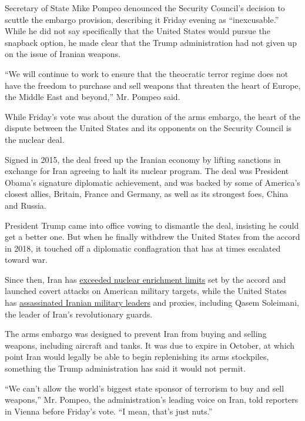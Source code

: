 Secretary of State Mike Pompeo denounced the Security Council's decision
to scuttle the embargo provision, describing it Friday evening as
``inexcusable.'' While he did not say specifically that the United
States would pursue the snapback option, he made clear that the Trump
administration had not given up on the issue of Iranian weapons.

``We will continue to work to ensure that the theocratic terror regime
does not have the freedom to purchase and sell weapons that threaten the
heart of Europe, the Middle East and beyond,'' Mr. Pompeo said.

While Friday's vote was about the duration of the arms embargo, the
heart of the dispute between the United States and its opponents on the
Security Council is the nuclear deal.

Signed in 2015, the deal freed up the Iranian economy by lifting
sanctions in exchange for Iran agreeing to halt its nuclear program. The
deal was President Obama's signature diplomatic achievement, and was
backed by some of America's closest allies, Britain, France and Germany,
as well as its strongest foes, China and Russia.

President Trump came into office vowing to dismantle the deal, insisting
he could get a better one. But when he finally withdrew the United
States from the accord in 2018, it touched off a diplomatic
conflagration that has at times escalated toward war.

Since then, Iran has
\href{https://www.nytimes3xbfgragh.onion/2019/07/01/world/middleeast/iran-uranium-enrichment-limit.html}{exceeded
nuclear enrichment limits} set by the accord and launched covert attacks
on American military targets, while the United States has
\href{https://www.nytimes3xbfgragh.onion/2020/01/02/world/middleeast/qassem-soleimani-iraq-iran-attack.html}{assassinated
Iranian military leaders} and proxies, including Qasem Soleimani, the
leader of Iran's revolutionary guards.

The arms embargo was designed to prevent Iran from buying and selling
weapons, including aircraft and tanks. It was due to expire in October,
at which point Iran would legally be able to begin replenishing its arms
stockpiles, something the Trump administration has said it would not
permit.

``We can't allow the world's biggest state sponsor of terrorism to buy
and sell weapons,'' Mr. Pompeo, the administration's leading voice on
Iran, told reporters in Vienna before Friday's vote. ``I mean, that's
just nuts.''

